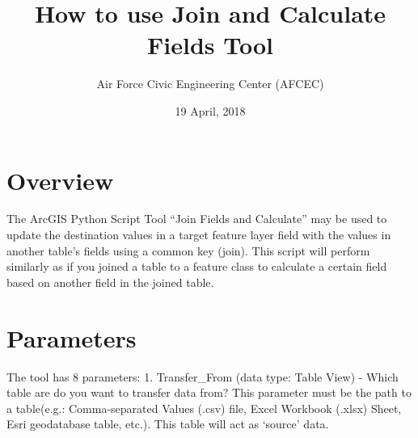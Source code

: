 \documentclass[]{article}
\title{How to use Join and Calculate Fields Tool}
\author{Air Force Civic Engineering Center (AFCEC)}
\date{19 April, 2018}
\begin{document}
\maketitle

\section{Overview}\label{overview}

The ArcGIS Python Script Tool ``Join Fields and Calculate'' may be used
to update the destination values in a target feature layer field with
the values in another table's fields using a common key (join). This
script will perform similarly as if you joined a table to a feature
class to calculate a certain field based on another field in the joined
table.

\section{Parameters}\label{parameters}

The tool has 8 parameters: 1. Transfer\_From (data type: Table View) -
Which table are do you want to transfer data from? This parameter must
be the path to a table(e.g.: Comma-separated Values (.csv) file, Excel
Workbook (.xlsx) Sheet, Esri geodatabase table, etc.). This table will
act as `source' data.
\end{document}
